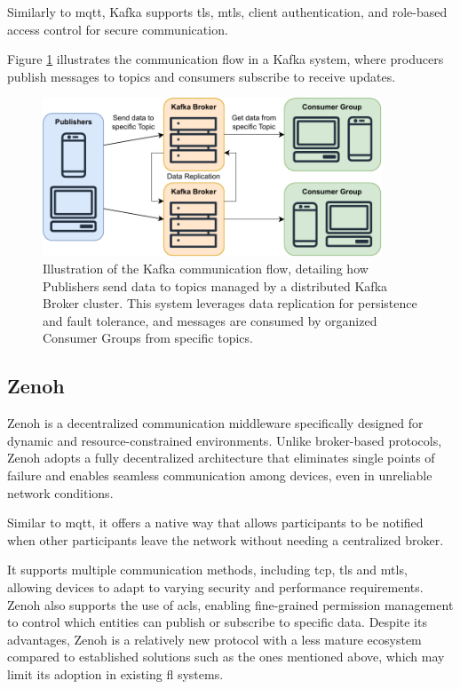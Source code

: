 Similarly to \ac{mqtt}, Kafka supports \ac{tls}, \ac{mtls}, client authentication, and role-based access control for secure communication.

Figure \ref{fig:kafka_comm} illustrates the communication flow in a Kafka system, where producers publish messages to topics and consumers subscribe to receive updates.

\begin{figure}[!htb]
    \centering
    \includegraphics[width=0.9\textwidth]{figs/kafka_comm.pdf}
    \caption[Kafka Communication Flow]{Illustration of the Kafka communication flow, detailing how Publishers send data to topics managed by a distributed Kafka Broker cluster. This system leverages data replication for persistence and fault tolerance, and messages are consumed by organized Consumer Groups from specific topics.}
    \label{fig:kafka_comm}
\end{figure}

\subsection{Zenoh}
\label{sec:zenoh}

Zenoh is a decentralized communication middleware specifically designed for dynamic and resource-constrained environments. Unlike broker-based protocols, Zenoh adopts a fully decentralized architecture that eliminates single points of failure and enables seamless communication among devices, even in unreliable network conditions. 

Similar to \ac{mqtt}, it offers a native way that allows participants to be notified when other participants leave the network without needing a centralized broker.

It supports multiple communication methods, including \ac{tcp}, \ac{tls} and \ac{mtls}, allowing devices to adapt to varying security and performance requirements. Zenoh also supports the use of \acp{acl}, enabling fine-grained permission management to control which entities can publish or subscribe to specific data. Despite its advantages, Zenoh is a relatively new protocol with a less mature ecosystem compared to established solutions such as the ones mentioned above, which may limit its adoption in existing \ac{fl} systems.


